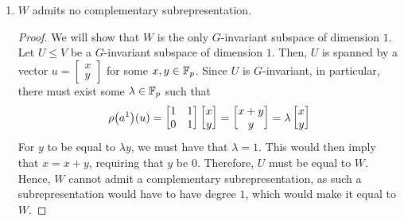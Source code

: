 \begin{boxnexample}
\begin{enumerate}
\begin{proof}
\begin{align*}
\begin{bmatrix}
                    x \\ 0
                \end{bmatrix}
                = \begin{bmatrix}
                    x \\ 0
                \end{bmatrix} \in W
            \end{align*}
            showing not only that $W$ is $G$-invariant but also that the corresponding subrepresentation is trivial.
        \end{proof}
        \item $W$ admits no complementary subrepresentation.
        \begin{proof}
            We will show that $W$ is the only $G$-invariant subspace of dimension $1$. Let $U \leq V$ be a $G$-invariant subspace of dimension $1$. Then, $U$ is spanned by a vector $u = \begin{bmatrix} x \\ y \end{bmatrix}$ for some $x,y \in \mathbb{F}_p$. Since $U$ is $G$-invariant, in particular, there must exist some $\lambda \in \mathbb{F}_p$ such that
            \begin{align*}
                \rho\!\left( a^1 \right)\!\left( u \right) = 
                \begin{bmatrix}
                    1 & 1 \\ 0 & 1
                \end{bmatrix}
                \begin{bmatrix}
                    x \\ y
                \end{bmatrix}
                = \begin{bmatrix}
                    x + y \\ y
                \end{bmatrix}
                = \lambda \begin{bmatrix}
                    x \\ y
                \end{bmatrix}
            \end{align*}
            For $y$ to be equal to $\lambda y$, we must have that $\lambda = 1$. This would then imply that $x = x + y$, requiring that $y$ be $0$. Therefore, $U$ must be equal to $W$. Hence, $W$ cannot admit a complementary subrepresentation, as such a subrepresentation would have to have degree $1$, which would make it equal to $W$.
        \end{proof}

\end{enumerate}
\end{boxnexample}

